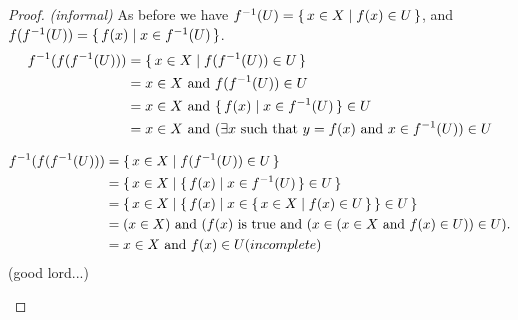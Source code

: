 \documentclass[../../main.tex]{subfiles}
\begin{document}
\begin{enumerate}
        \begin{ans}
            
        \end{ans}
            
        \begin{proof}
            \emph{(informal)}
            As before we have $f^{-1}(U) = \{\,x \in X\mid f(x) \in U\,\}$, and $f(f^{-1}(U)) = \{\,f(x)\mid x \in f^{-1}(U)\,\}$.
            \begin{align*}
                f^{-1}(f(f^{-1}(U))) 
                &= \{\,x \in X\mid f(f^{-1}(U)) \in U\,\}\\
                &= x \in X \textnormal{ and } f(f^{-1}(U)) \in U\\
                &= x \in X \textnormal{ and } \{\,f(x)\mid x \in f^{-1}(U)\,\} \in U\\
                &= x \in X \textnormal{ and } ( \exists x \textnormal{ such that } y=f(x) \textnormal{ and } x \in f^{-1}(U) ) \in U\\  
            \end{align*}
            \begin{xx}
                \begin{align*}
                    f^{-1}(f(f^{-1}(U))) 
                    &= \{\,x \in X\mid f(f^{-1}(U)) \in U\,\}\\
                    &= \{\,x \in X\mid\{\,f(x)\mid x \in f^{-1}(U)\,\} \in U\,\}\\
                    &= \{\,x \in X\mid\{\,f(x)\mid x \in \{\,x \in X\mid f(x) \in U\,\}\,\}\in U\,\}\\
                    &= (x \in X) \textnormal{ and } (f(x) \textnormal{ is true and } (x \in (x \in X \textnormal{ and } f(x) \in U))\in U). \\
                    &= x \in X \textnormal{ and } f(x) \in U (incomplete)
                \end{align*}
                (good lord...)
            \end{xx}
        \end{proof}
\end{enumerate}
\end{document}
